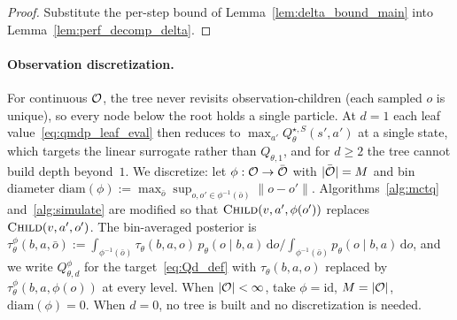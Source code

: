 \begin{proof}
Substitute the per-step bound of Lemma~\ref{lem:delta_bound_main} into Lemma~\ref{lem:perf_decomp_delta}.
\end{proof}

\paragraph{Observation discretization.}
For continuous ${\mathcal{O}}$, the tree never revisits observation-children (each sampled $o$ is unique), so every node below the root holds a single particle.
At $d=1$ each leaf value~\eqref{eq:qmdp_leaf_eval} then reduces to $\max_{a'}Q_\theta^{\star,S}(s',a')$ at a single state, which targets the linear surrogate rather than $Q_{\theta,1}$, and for $d\ge2$ the tree cannot build depth beyond~$1$.
We discretize: let $\phi:{\mathcal{O}}\to\bar{{\mathcal{O}}}$ with $|\bar{{\mathcal{O}}}|=M$ and bin diameter $\mathrm{diam}(\phi):=\max_{\bar o}\sup_{o,o'\in\phi^{-1}(\bar o)}\|o-o'\|$.
Algorithms~\ref{alg:mctq} and~\ref{alg:simulate} are modified so that $\textsc{Child}(v,a',\phi(o'))$ replaces $\textsc{Child}(v,a',o')$.
The bin-averaged posterior is $\tau_\theta^{\phi}(b,a,\bar o):=\int_{\phi^{-1}(\bar o)} \tau_\theta(b,a,o)\,p_\theta(o\mid b,a)\,\mathrm do\big/\int_{\phi^{-1}(\bar o)} p_\theta(o\mid b,a)\,\mathrm do$, and we write $Q_{\theta,d}^{\phi}$ for the target~\eqref{eq:Qd_def} with $\tau_\theta(b,a,o)$ replaced by $\tau_\theta^{\phi}(b,a,\phi(o))$ at every level.
When $|{\mathcal{O}}|<\infty$, take $\phi=\mathrm{id}$, $M=|{\mathcal{O}}|$, $\mathrm{diam}(\phi)=0$.
When $d=0$, no tree is built and no discretization is needed.

